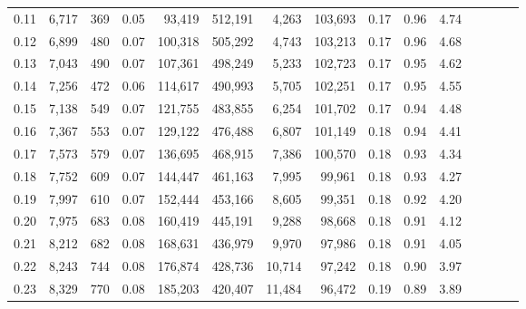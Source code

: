 \begin{tabular}{rrrcrrrrrrrrrrr}
0.11 &   6,717 &    369 &                                       0.05 &   93,419 &  512,191 &    4,263 &  103,693 &  0.17 &  0.96 &                         4.74 \\
0.12 &   6,899 &    480 &                                       0.07 &  100,318 &  505,292 &    4,743 &  103,213 &  0.17 &  0.96 &                         4.68 \\
0.13 &   7,043 &    490 &                                       0.07 &  107,361 &  498,249 &    5,233 &  102,723 &  0.17 &  0.95 &                         4.62 \\
0.14 &   7,256 &    472 &                                       0.06 &  114,617 &  490,993 &    5,705 &  102,251 &  0.17 &  0.95 &                         4.55 \\
0.15 &   7,138 &    549 &                                       0.07 &  121,755 &  483,855 &    6,254 &  101,702 &  0.17 &  0.94 &                         4.48 \\
0.16 &   7,367 &    553 &                                       0.07 &  129,122 &  476,488 &    6,807 &  101,149 &  0.18 &  0.94 &                         4.41 \\
0.17 &   7,573 &    579 &                                       0.07 &  136,695 &  468,915 &    7,386 &  100,570 &  0.18 &  0.93 &                         4.34 \\
0.18 &   7,752 &    609 &                                       0.07 &  144,447 &  461,163 &    7,995 &   99,961 &  0.18 &  0.93 &                         4.27 \\
0.19 &   7,997 &    610 &                                       0.07 &  152,444 &  453,166 &    8,605 &   99,351 &  0.18 &  0.92 &                         4.20 \\
0.20 &   7,975 &    683 &                                       0.08 &  160,419 &  445,191 &    9,288 &   98,668 &  0.18 &  0.91 &                         4.12 \\
0.21 &   8,212 &    682 &                                       0.08 &  168,631 &  436,979 &    9,970 &   97,986 &  0.18 &  0.91 &                         4.05 \\
0.22 &   8,243 &    744 &                                       0.08 &  176,874 &  428,736 &   10,714 &   97,242 &  0.18 &  0.90 &                         3.97 \\
0.23 &   8,329 &    770 &                                       0.08 &  185,203 &  420,407 &   11,484 &   96,472 &  0.19 &  0.89 &                         3.89 \\

\end{tabular}
